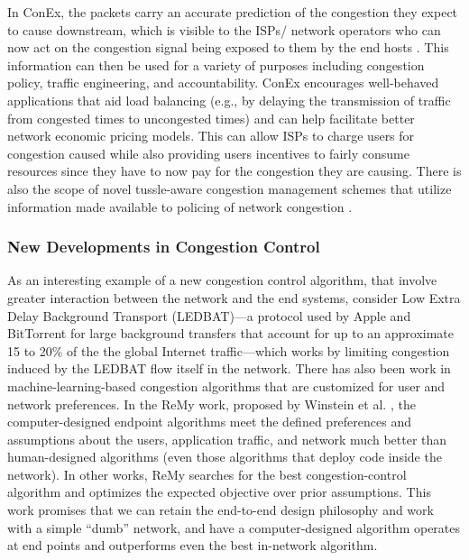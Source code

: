 \documentclass[10pt]{IEEEtran}
\begin{document}
In ConEx, the packets carry an accurate prediction of the congestion they expect to cause downstream, which is visible to the ISPs/ network operators who can now act on the congestion signal being exposed to them by the end hosts \cite{moncaster2009need}. This information can then be used for a variety of purposes including congestion policy, traffic engineering, and accountability. ConEx encourages well-behaved applications that aid load balancing (e.g., by delaying the transmission of traffic from congested times to uncongested times) and can help facilitate better network economic pricing models. This can allow ISPs to charge users for congestion caused while also providing users incentives to fairly consume resources since they have to now pay for the congestion they are causing. There is also the scope of novel tussle-aware congestion management schemes that utilize information made available to policing of network congestion \cite{briscoe2005policing}.

\vspace{2mm}
\subsubsection{New Developments in Congestion Control}

As an interesting example of a new congestion control algorithm, that involve greater interaction between the network and the end systems, consider Low Extra Delay Background Transport (LEDBAT)---a protocol used by Apple and BitTorrent for large background transfers that account for up to an approximate 15 to 20\% of the the global Internet traffic---which works by limiting congestion induced by the LEDBAT flow itself in the network. There has also been work in machine-learning-based congestion algorithms that are customized for user and network preferences. In the ReMy work, proposed by Winstein et al. \cite{winstein2013tcp}, the computer-designed endpoint algorithms meet the defined preferences and assumptions about the users, application traffic, and network much better than human-designed algorithms (even those algorithms that deploy code inside the network). In other works, ReMy searches for the best congestion-control algorithm and optimizes the expected objective over prior assumptions. This work promises that we can retain the end-to-end design philosophy and work with a simple ``dumb'' network, and have a computer-designed algorithm operates at end points and outperforms even the best in-network algorithm. 
\end{document}
